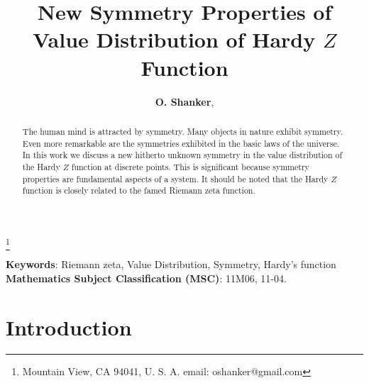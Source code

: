 \documentclass[twoside]{article}
\begin{document}


\newtheorem{theorem}{Theorem}[section]
\newtheorem{lemma}[theorem]{Lemma}

\theoremstyle{definition}
\newtheorem{definition}[theorem]{Definition}
\newtheorem{example}[theorem]{Example}
\newtheorem{xca}[theorem]{Exercise}

\theoremstyle{remark}
\newtheorem{remark}[theorem]{Remark}



\date{}
\lhead[]{}
\rhead[]{}

\title{\bf{New Symmetry Properties of Value Distribution of Hardy $Z$ Function}}

\maketitle


\author{{\textbf{O. Shanker}},}
\thanks{ Mountain View, CA 94041, U. S. A. email: oshanker@gmail.com}

\thispagestyle{fancy}

\begin{abstract}
The human mind is attracted by symmetry. Many objects in nature exhibit symmetry.
Even more remarkable are the symmetries exhibited in the basic laws of the 
universe. In this work we discuss a new hitherto unknown symmetry in the value
distribution of the Hardy $Z$ function at discrete points. This is significant because symmetry properties
are fundamental aspects of a system. It should be noted that the Hardy $Z$ function is closely
related to the famed Riemann zeta function.

\end{abstract}
{\textbf {Keywords}:} Riemann zeta, Value Distribution, Symmetry, Hardy's function
{\textbf {Mathematics Subject Classification (MSC)}:} 11M06, 11-04.




\section{Introduction}
\end{document}
